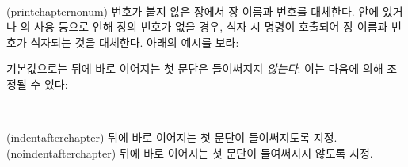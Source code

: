 \begin{syntax}
\cmd{\printchapternonum} \\
\end{syntax}
\glossary(printchapternonum)%
  {}%
  {번호가 붙지 않은 장에서 장 이름과 번호를 대체한다.}
\cmd{\frontmatter} 안에 있거나 \cmd{\chapter*}의 사용 등으로 인해
장의 번호가 없을 경우,
식자 시 \cmd{\printchapternonum} 명령이 호출되어 장 이름과 번호가 식자되는 것을 대체한다.
아래의 예시를 보라:
\begin{lcode}
\newcommand{\chapterhead}[1]{ %
  \clearforchapter        %
  \thispagestyle{chapter} %
  \insertchapterspace     %
  \chapterheadstart       %
  \printchaptername\chapternamenum\printchapternum
  \afterchapternum        %
  \printchaptertitle{#1}  %
  \afterchaptertitle}     %
\end{lcode}
%
%
%
기본값으로는  뒤에 바로 이어지는 첫 문단은 들여써지지 \emph{않는다}.
이는 다음에 의해 조정될 수 있다:
\begin{syntax}
  \cmd{\indentafterchapter}\\
  \cmd{\noindentafterchapter}
\end{syntax}
\glossary(indentafterchapter)%
{}%
{ 뒤에 바로 이어지는 첫 문단이 들여써지도록 지정.}
\glossary(noindentafterchapter)%
{}%
{ 뒤에 바로 이어지는 첫 문단이 들여써지지 않도록 지정.}


